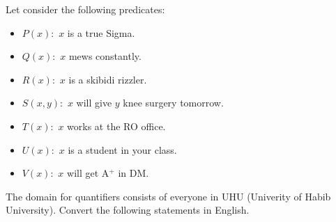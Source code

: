 \documentclass[a4paper]{exam}
\begin{document}
\begin{questions}
    


    \question Let consider the following predicates:
    \begin{itemize}
        \item $P(x):$ $x$ is a true Sigma.
        \item $Q(x):$ $x$ mews constantly.
        \item $R(x):$ $x$ is a skibidi rizzler.
        \item $S(x,y):$ $x$ will give $y$ knee surgery tomorrow.
        \item $T(x):$ $x$ works at the RO office. 
        \item $U(x):$ $x$ is a student in your class. 
        \item $V(x):$ $x$ will get A$^+$ in DM. 
    \end{itemize}
    The domain for quantifiers consists of everyone in UHU (Univerity of Habib University).
    Convert the following statements in English.
\end{questions}
\end{document}
